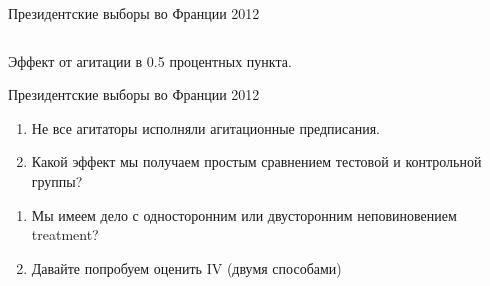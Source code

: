 \documentclass[12pt]{beamer}
\begin{document}
\begin{frame}{Президентские выборы во Франции 2012 \parencite{pons2018will}}
\begin{columns}
\end{columns}
Эффект от агитации в 0.5 процентных пункта. 
\end{frame}


\begin{frame}{Президентские выборы во Франции 2012 \parencite{pons2018will}}

\begin{enumerate}
    \item Не все агитаторы исполняли агитационные предписания.
    \item Какой эффект мы получаем простым сравнением тестовой и контрольной группы?
\end{enumerate}

\begin{enumerate}
    \item Мы имеем дело с односторонним или двусторонним неповиновением treatment?
    \item Давайте попробуем оценить IV (двумя способами)
\end{enumerate}

\end{frame}
\end{document}
